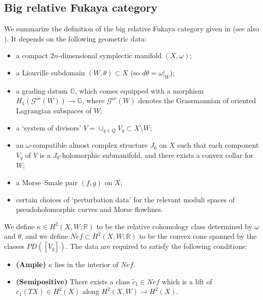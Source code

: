 \documentclass{article}
\def\G{\mathbb{G}}
\def\cG{\mathcal{G}}
\def\G{\mathbb{G}}
\def\R{\mathbb{R}}
\begin{document}
\subsection{Big relative Fukaya category}

We summarize the definition of the big relative Fukaya category given in \cite{relfukii} (see also \cite{perutz2022constructing}). 
It depends on the following geometric data:
\begin{itemize}
    \item a compact $2n$-dimensional symplectic manifold $(X,\omega)$;
    \item a Liouville subdomain $(W,\theta) \subset X$ (so $d\theta = \omega|_W$);
    \item a grading datum $\G$, which comes equipped with a morphism $H_1(\cG^{or}(W)) \to \G$, where $\cG^{or}(W)$ denotes the Grassmannian of oriented Lagrangian subspaces of $W$;
    \item a `system of divisors' $V = \cup_{q \in Q} V_q \subset X \setminus W$;
    \item an $\omega$-compatible almost complex structure $J_0$ on $X$ such that each component $V_q$ of $V$ is a $J_0$-holomorphic submanifold, and there exists a convex collar for $W$;
    \item a Morse--Smale pair $(f,g)$ on $X$;
    \item certain choices of `perturbation data' for the relevant moduli spaces of pseudoholomorphic curves and Morse flowlines. 
\end{itemize}

We define $\kappa \in H^2(X,W;\R)$ to be the relative cohomology class determined by $\omega$ and $\theta$, and we define $Nef \subset H^2(X,W;\R)$ to be the convex cone spanned by the classes $PD([V_q])$. 
The data are required to satisfy the following conditions:
\begin{itemize}
    \item \textbf{(Ample)} $\kappa$ lies in the interior of $Nef$.
    \item \textbf{(Semipositive)} There exists a class $\tilde{c}_1 \in Nef$ which is a lift of $c_1(TX) \in H^2(X)$ along $H^2(X,W) \to H^2(X)$. 
\end{itemize}
\end{document}
